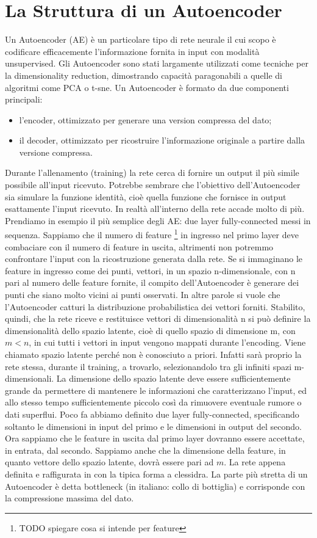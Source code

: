 \section{La Struttura di un Autoencoder}
Un Autoencoder (AE) è un particolare tipo di rete neurale il cui scopo è codificare efficacemente l'informazione fornita in input con modalità unsupervised.
Gli Autoencoder sono stati largamente utilizzati come tecniche per la dimensionality reduction, dimostrando capacità paragonabili a quelle di algoritmi come PCA o t-sne.
Un Autoencoder è formato da due componenti principali:
\begin{itemize}
    \item l'encoder, ottimizzato per generare una version compressa del dato;
    \item il decoder, ottimizzato per ricostruire l'informazione originale a partire dalla versione compressa.
\end{itemize}
Durante l'allenamento (training) la rete cerca di fornire un output il più simile possibile all'input ricevuto.
Potrebbe sembrare che l'obiettivo %
dell'Autoencoder sia simulare la funzione identità, cioè quella funzione che fornisce in output esattamente l'input ricevuto.
In realtà all'interno della rete accade molto di più.
Prendiamo in esempio il più semplice degli AE: due layer fully-connected messi in sequenza.
Sappiamo che il numero di feature \footnote{TODO spiegare cosa si intende per feature} in ingresso nel primo layer deve combaciare con il numero di feature in uscita, altrimenti non potremmo confrontare l'input con la ricostruzione generata dalla rete.
Se si immaginano le feature in ingresso come dei punti, vettori, in un spazio n-dimensionale, con n pari al numero delle feature fornite, il compito dell'Autoencoder è generare dei punti che siano molto vicini ai punti osservati.
In altre parole si vuole che l'Autoencoder catturi la distribuzione probabilistica dei vettori forniti.
Stabilito, quindi, che la rete riceve e restituisce vettori di dimensionalità n si può definire la dimensionalità dello spazio latente, cioè di quello spazio di dimensione m, con $m < n$, in cui tutti i  vettori in input vengono mappati durante l'encoding.
Viene chiamato spazio latente perché non è conosciuto a priori.
Infatti sarà proprio la rete stessa, durante il training, a trovarlo, selezionandolo tra gli infiniti spazi m-dimensionali.
La dimensione dello spazio latente deve essere sufficientemente grande da permettere di mantenere le informazioni che caratterizzano l'input, ed allo stesso tempo sufficientemente piccolo così da rimuovere eventuale rumore o dati superflui.
Poco fa abbiamo definito due layer fully-connected, specificando soltanto le dimensioni in input del primo e le dimensioni in output del secondo.
Ora sappiamo che le feature in uscita dal primo layer dovranno essere accettate, in entrata, dal secondo.
Sappiamo anche che la dimensione della feature, in quanto vettore dello spazio latente, dovrà essere pari ad $m$.
La rete appena definita e raffigurata in %
con la tipica forma a clessidra.
La parte più stretta di un Autoencoder è detta bottleneck (in italiano: collo di bottiglia) e corrisponde con la compressione massima del dato.

